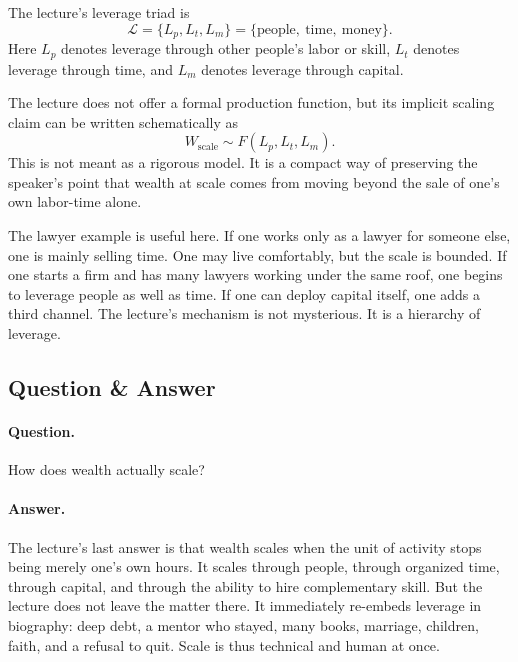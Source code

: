 \begin{definition}
The lecture's leverage triad is
\begin{equation}
\mathcal{L}=\{L_p,L_t,L_m\}
=\{\text{people},\ \text{time},\ \text{money}\}.
\end{equation}
Here \(L_p\) denotes leverage through other people's labor or skill, \(L_t\) denotes leverage through time, and \(L_m\) denotes leverage through capital.
\end{definition}

The lecture does not offer a formal production function, but its implicit scaling claim can be written schematically as
\begin{equation}
W_{\text{scale}} \sim F(L_p,L_t,L_m).
\end{equation}
This is not meant as a rigorous model. It is a compact way of preserving the speaker's point that wealth at scale comes from moving beyond the sale of one's own labor-time alone.

\begin{figure}[h]
\centering
{}
\end{figure}

The lawyer example is useful here. If one works only as a lawyer for someone else, one is mainly selling time. One may live comfortably, but the scale is bounded. If one starts a firm and has many lawyers working under the same roof, one begins to leverage people as well as time. If one can deploy capital itself, one adds a third channel. The lecture's mechanism is not mysterious. It is a hierarchy of leverage.

\subsection{Question \& Answer}

\paragraph{Question.} How does wealth actually scale?

\paragraph{Answer.} The lecture's last answer is that wealth scales when the unit of activity stops being merely one's own hours. It scales through people, through organized time, through capital, and through the ability to hire complementary skill. But the lecture does not leave the matter there. It immediately re-embeds leverage in biography: deep debt, a mentor who stayed, many books, marriage, children, faith, and a refusal to quit. Scale is thus technical and human at once.


